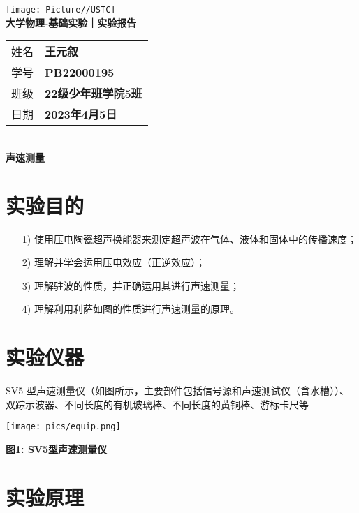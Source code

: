 \documentclass[10pt,a4paper]{article}	%
\makeatletter
\newcommand{\nexp}{声速测量}
\newenvironment{figurehere}
{\def\@captype{figure}}
{}
\makeatother
\begin{document}
	\vspace*{-5em}
	\begin{center}
		\texttt{[image: Picture//USTC]}\\
		\Large \textbf{大学物理-基础实验｜实验报告}\\[5mm]

		\normalsize
		\begin{tabular}{ll}
			姓名 & \textbf{王元叙}\\
			学号 & \textbf{PB22000195}\\
			班级 & \textbf{22级少年班学院5班}\\
			日期 & \textbf{2023年4月5日}\\	
		\end{tabular}\\[5mm]

		\LARGE \textbf{\nexp}\\[5mm]	

	\end{center}

	\section{实验目的}

	\begin{enumerate}
		\item[1)] 使用压电陶瓷超声换能器来测定超声波在气体、液体和固体中的传播速度；
		\item[2)] 理解并学会运用压电效应（正逆效应）；
		\item[3)] 理解驻波的性质，并正确运用其进行声速测量；
		\item[4)] 理解利用利萨如图的性质进行声速测量的原理。
	
	\end{enumerate}

	\section{实验仪器}
    SV5 型声速测量仪（如图所示，主要部件包括信号源和声速测试仪（含水槽））、双踪示波器、不同长度的有机玻璃棒、不同长度的黄铜棒、游标卡尺等
	
	\begin{figurehere}
		\centering
		\texttt{[image: pics/equip.png]}
		\caption*{\bf 图1: SV5型声速测量仪}
	\end{figurehere}

	\section{实验原理}
\end{document}
